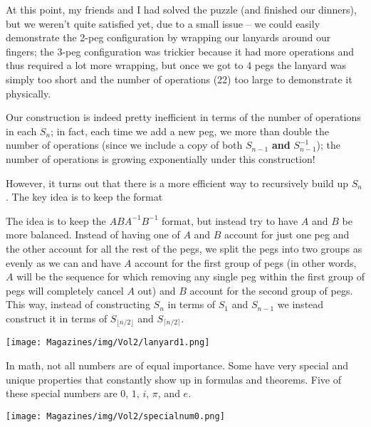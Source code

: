 \documentclass{article}
\begin{document}
\begin{multicols}{3}
At this point, my friends and I had solved the puzzle (and finished our dinners), but we weren’t quite satisfied yet, due to a small issue -- we could easily demonstrate the 2-peg configuration by wrapping our lanyards around our fingers; the 3-peg configuration was trickier because it had more operations and thus required a lot more wrapping, but once we got to 4 pegs the lanyard was simply too short and the number of operations (22) too large to demonstrate it physically.

Our construction is indeed pretty inefficient in terms of the number of operations in each $S_n$; in fact, each time we add a new peg, we more than double the number of operations (since we include a copy of both $S_{n-1}$ \textbf{and} $S_{n-1}^{-1}$); the number of operations is growing exponentially under this construction!

However, it turns out that there is a more efficient way to recursively build up $S_n$. The key idea is to keep the format 

The idea is to keep the $ABA^{-1}B^{-1}$ format, but instead try to have $A$ and $B$ be more balanced. Instead of having one of $A$ and $B$ account for just one peg and the other account for all the rest of the pegs, we split the pegs into two groups as evenly as we can and have $A$ account for the first group of pegs (in other words, $A$ will be the sequence for which removing any single peg within the first group of pegs will completely cancel $A$ out) and $B$ account for the second group of pegs. This way, instead of constructing $S_n$ in terms of $S_1$ and $S_{n-1}$ we instead construct it in terms of $S_{\lfloor n/2\rfloor}$ and $S_{\lceil n/2 \rceil}$. 

\begin{center}
    \texttt{[image: Magazines/img/Vol2/lanyard1.png]}
\end{center}

\closearticle
\clearcolumn


In math, not all numbers are of equal importance. Some have very special and unique properties that constantly show up in formulas and theorems. Five of these special numbers are $0$, $1$, $i$, $\pi$, and $e$.

\begin{center}
\texttt{[image: Magazines/img/Vol2/specialnum0.png]}
\end{center}


\end{multicols}
\end{document}
